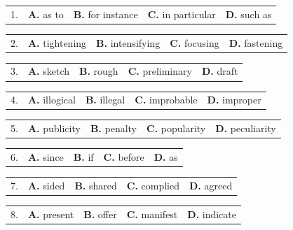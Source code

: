 \documentclass[UTF8,11pt]{ctexart}
\begin{document}
\noindent\begin{tabularx}{\linewidth}{@{}lXXXX@{}}1. & \textbf{A.} as to & \textbf{B.} for instance & \textbf{C.} in particular & \textbf{D.} such as\\\end{tabularx}\par

\noindent\begin{tabularx}{\linewidth}{@{}lXXXX@{}}2. & \textbf{A.} tightening & \textbf{B.} intensifying & \textbf{C.} focusing & \textbf{D.} fastening\\\end{tabularx}\par

\noindent\begin{tabularx}{\linewidth}{@{}lXXXX@{}}3. & \textbf{A.} sketch & \textbf{B.} rough & \textbf{C.} preliminary & \textbf{D.} draft\\\end{tabularx}\par

\noindent\begin{tabularx}{\linewidth}{@{}lXXXX@{}}4. & \textbf{A.} illogical & \textbf{B.} illegal & \textbf{C.} improbable & \textbf{D.} improper\\\end{tabularx}\par

\noindent\begin{tabularx}{\linewidth}{@{}lXXXX@{}}5. & \textbf{A.} publicity & \textbf{B.} penalty & \textbf{C.} popularity & \textbf{D.} peculiarity\\\end{tabularx}\par

\noindent\begin{tabularx}{\linewidth}{@{}lXXXX@{}}6. & \textbf{A.} since & \textbf{B.} if & \textbf{C.} before & \textbf{D.} as\\\end{tabularx}\par

\noindent\begin{tabularx}{\linewidth}{@{}lXXXX@{}}7. & \textbf{A.} sided & \textbf{B.} shared & \textbf{C.} complied & \textbf{D.} agreed\\\end{tabularx}\par

\noindent\begin{tabularx}{\linewidth}{@{}lXXXX@{}}8. & \textbf{A.} present & \textbf{B.} offer & \textbf{C.} manifest & \textbf{D.} indicate\\\end{tabularx}\par
\end{document}
